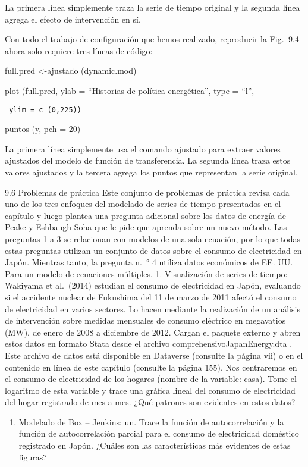 \documentclass[
]{book}
\providecommand{\tightlist}{%
  \setlength{\itemsep}{0pt}\setlength{\parskip}{0pt}}
\begin{document}
La primera línea simplemente traza la serie de tiempo original y la segunda línea agrega el efecto de intervención en sí.

Con todo el trabajo de configuración que hemos realizado, reproducir la Fig.  9.4 ahora solo requiere tres líneas de código:

full.pred \textless-ajustado (dynamic.mod)

plot (full.pred, ylab = ``Historias de política energética'', type = ``l'',

\begin{verbatim}
 ylim = c (0,225))
\end{verbatim}

puntos (y, pch = 20)

La primera línea simplemente usa el comando ajustado para extraer valores ajustados del modelo de función de transferencia. La segunda línea traza estos valores ajustados y la tercera agrega los puntos que representan la serie original.

9.6 Problemas de práctica
Este conjunto de problemas de práctica revisa cada uno de los tres enfoques del modelado de series de tiempo presentados en el capítulo y luego plantea una pregunta adicional sobre los datos de energía de Peake y Eshbaugh-Soha que le pide que aprenda sobre un nuevo método. Las preguntas 1 a 3 se relacionan con modelos de una sola ecuación, por lo que todas estas preguntas utilizan un conjunto de datos sobre el consumo de electricidad en Japón. Mientras tanto, la pregunta n.~° 4 utiliza datos económicos de EE. UU. Para un modelo de ecuaciones múltiples.
1.
Visualización de series de tiempo: Wakiyama et al.~(2014) estudian el consumo de electricidad en Japón, evaluando si el accidente nuclear de Fukushima del 11 de marzo de 2011 afectó el consumo de electricidad en varios sectores. Lo hacen mediante la realización de un análisis de intervención sobre medidas mensuales de consumo eléctrico en megavatios (MW), de enero de 2008 a diciembre de 2012. Cargan el paquete externo y abren estos datos en formato Stata desde el archivo comprehensivoJapanEnergy.dta . Este archivo de datos está disponible en Dataverse (consulte la página vii) o en el contenido en línea de este capítulo (consulte la página 155). Nos centraremos en el consumo de electricidad de los hogares (nombre de la variable: casa). Tome el logaritmo de esta variable y trace una gráfica lineal del consumo de electricidad del hogar registrado de mes a mes. ¿Qué patrones son evidentes en estos datos?

\begin{enumerate}
\def\labelenumi{\arabic{enumi}.}
\setcounter{enumi}{1}
\tightlist
\item
  Modelado de Box -- Jenkins:
  un.
  Trace la función de autocorrelación y la función de autocorrelación parcial para el consumo de electricidad doméstico registrado en Japón. ¿Cuáles son las características más evidentes de estas figuras?
\end{enumerate}
\end{document}
